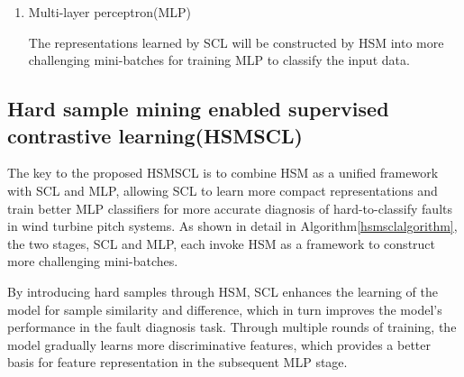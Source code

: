 \documentclass[lettersize,journal]{IEEEtran}
\begin{document}
\begin{enumerate}
With the powerful representation learning capability of SCL, the proposed method is capable of learning the rich representations in the data. In addition, the proposed method combines HSM with SCL by utilizing HSM to construct more challenging mini-batches, thus allowing SCL to learn more discriminative representations.

 

\item Multi-layer perceptron(MLP)

The representations learned by SCL will be constructed by HSM into more challenging mini-batches for training MLP to classify the input data.

\end{enumerate}

\subsection{Hard sample mining enabled supervised contrastive learning(HSMSCL)}%


The key to the proposed HSMSCL is to combine HSM as a unified framework with SCL and MLP, allowing SCL to learn more compact representations and train better MLP classifiers for more accurate diagnosis of hard-to-classify faults in wind turbine pitch systems. As shown in detail in Algorithm\ref{hsmsclalgorithm}, the two stages, SCL and MLP, each invoke HSM as a framework to construct more challenging mini-batches. 

By introducing hard samples through HSM, SCL enhances the learning of the model for sample similarity and difference, which in turn improves the model's performance in the fault diagnosis task. Through multiple rounds of training, the model gradually learns more discriminative features, which provides a better basis for feature representation in the subsequent MLP stage.
\end{document}
